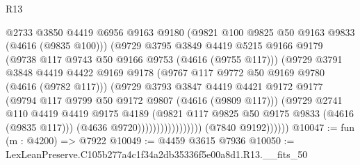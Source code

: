 \begin{lexlean}{R13}
\begin{coremodule}
                                      @2733
                                      @3850
                                      @4419
                                      @6956
                                      @9163
                                      @9180
                                      (@9821 @100 @9825 @50 @9163 @9833 (@4616 (@9835 @100)))
                                      (@9729
                                        @3795
                                        @3849
                                        @4419
                                        @5215
                                        @9166
                                        @9179
                                        (@9738 @117 @9743 @50 @9166 @9753 (@4616 (@9755 @117)))
                                        (@9729
                                          @3791
                                          @3848
                                          @4419
                                          @4422
                                          @9169
                                          @9178
                                          (@9767 @117 @9772 @50 @9169 @9780 (@4616 (@9782 @117)))
                                          (@9729
                                            @3793
                                            @3847
                                            @4419
                                            @4421
                                            @9172
                                            @9177
                                            (@9794 @117 @9799 @50 @9172 @9807 (@4616 (@9809 @117)))
                                            (@9729
                                              @2741
                                              @110
                                              @4419
                                              @4419
                                              @9175
                                              @4189
                                              (@9821
                                                @117
                                                @9825
                                                @50
                                                @9175
                                                @9833
                                                (@4616 (@9835 @117)))
                                              (@4636 @9720)))))))))))))))))
              (@7840 @9192))))))
@10047 := fun (m : @4200) => @7922
@10049 := @4459 @3615 @7936
@10050 := LexLeanPreserve.C105b277a4c1f34a2db35336f5e00a8d1.R13.__fits_50

\end{coremodule}
\end{lexlean}
